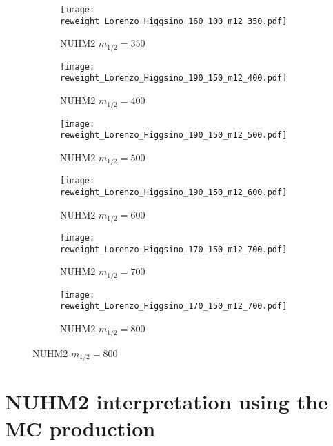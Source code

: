 \begin{figure}[htbp]
    \begin{center}
        \begin{subfigure}[b]{0.48\textwidth}
            \texttt{[image: reweight\_Lorenzo\_Higgsino\_160\_100\_m12\_350.pdf]}
            \caption{NUHM2 $m_{1/2}=350$~{\GeV}}
        \end{subfigure}
        \begin{subfigure}[b]{0.48\textwidth}
            \texttt{[image: reweight\_Lorenzo\_Higgsino\_190\_150\_m12\_400.pdf]}
            \caption{NUHM2 $m_{1/2}=400$~{\GeV}}
        \end{subfigure}
        \begin{subfigure}[b]{0.48\textwidth}
            \texttt{[image: reweight\_Lorenzo\_Higgsino\_190\_150\_m12\_500.pdf]}
            \caption{NUHM2 $m_{1/2}=500$~{\GeV}}
        \end{subfigure}
        \begin{subfigure}[b]{0.48\textwidth}
            \texttt{[image: reweight\_Lorenzo\_Higgsino\_190\_150\_m12\_600.pdf]}
            \caption{NUHM2 $m_{1/2}=600$~{\GeV}}
        \end{subfigure}
        \begin{subfigure}[b]{0.48\textwidth}
            \texttt{[image: reweight\_Lorenzo\_Higgsino\_170\_150\_m12\_700.pdf]}
            \caption{NUHM2 $m_{1/2}=700$~{\GeV}}
        \end{subfigure}
        \begin{subfigure}[b]{0.48\textwidth}
            \texttt{[image: reweight\_Lorenzo\_Higgsino\_170\_150\_m12\_700.pdf]}
            \caption{NUHM2 $m_{1/2}=800$~{\GeV}}
        \end{subfigure}
    \end{center}



    \label{fig:results_nuhm2_reweighting}
\end{figure}





\section{NUHM2 interpretation using the MC production}
\label{sec:results_mc_production}
